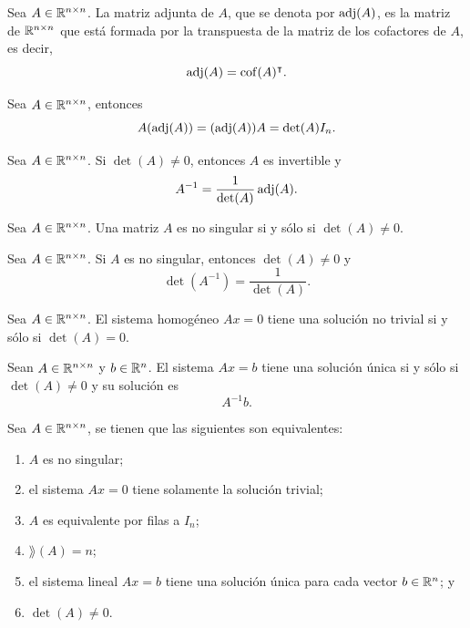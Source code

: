 \documentclass[a4,11pt]{aleph-notas}
\begin{document}
\begin{defi}
    Sea $A \in \Mat[\R]{n}{n}$. La matriz adjunta de $A$, que se denota por $\adj(A)$, es la matriz de $\Mat[\R]{n}{n}$ que está formada por la transpuesta de la matriz de los cofactores de $A$, es decir, 
    \[
        \adj(A) = \cof(A)^\intercal.
    \]
\end{defi}

\begin{teo}
    Sea $A \in \Mat[\R]{n}{n}$, entonces
    \[
        A (\adj(A)) = (\adj(A))A = \det(A)I_n.
    \]
\end{teo}

\begin{cor}
    Sea $A \in \Mat[\R]{n}{n}$. Si $\det(A) \neq 0$, entonces $A$ es invertible y
    \[
        A^{-1} = \dfrac{1}{\det(A)} \adj(A).
    \]
\end{cor}

\begin{teo}
    Sea $A \in \Mat[\R]{n}{n}$. Una matriz $A$ es no singular si y sólo si $\det(A) \neq 0$.
\end{teo}


\begin{teo}
    Sea $A \in \Mat[\R]{n}{n}$. Si $A$ es no singular, entonces $\det(A) \neq 0$ y 
    \[
        \det(A^{-1}) = \dfrac{1}{\det(A)}.
    \]
\end{teo}

\begin{teo}
    Sea $A \in \Mat[\R]{n}{n}$. El sistema homogéneo $Ax = 0$ tiene una solución no trivial si y sólo si $\det(A) = 0$.
\end{teo}

\begin{teo}
    Sean $A \in \Mat[\R]{n}{n}$ y $b\in\R^n$. El sistema $Ax = b$ tiene una solución única si y sólo si $\det(A) \neq 0$ y su solución es
    \[
        A^{-1}b.
    \]
\end{teo}

\begin{teo}
    
    Sea $A \in \Mat[\R]{n}{n}$, se tienen que las siguientes son equivalentes:
    \begin{enumerate}
    \item 
        $A$ es no singular;
    \item 
        el sistema $Ax=0$ tiene solamente la solución trivial;
    \item 
        $A$ es equivalente por filas a $I_n$;
    \item 
        $\rang(A)=n$; 
    \item 
        el sistema lineal $Ax=b$ tiene una solución única para cada vector $b \in \R^{n}$; y
    \item 
        $\det(A) \neq 0$.
    \end{enumerate}
\end{teo}
\end{document}
